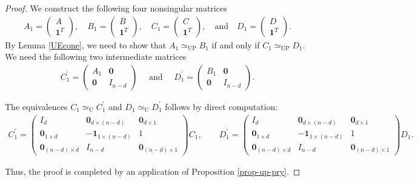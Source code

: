 \documentclass[reqno, 12pt]{article}
\theoremstyle{mydefinition}
\theoremstyle{myremark}
\numberwithin{algorithm}{section}
\begin{document}
\begin{proof}
We construct the following four nonsingular matrices
\begin{align*}
A_1 = \begin{pmatrix} A \\ \mathbf{1}^T \end{pmatrix}, \quad
B_1 = \begin{pmatrix} B \\ \mathbf{1}^T \end{pmatrix}, \quad
C_1 = \begin{pmatrix} C \\ \mathbf{1}^T \end{pmatrix}, \quad \text{and} \quad
D_1 = \begin{pmatrix} D \\ \mathbf{1}^T \end{pmatrix}.
\end{align*}
By Lemma \ref{UEcone}, we need to show that $A_1 \simeq_{\mathrm{UP}} B_1$ if and only if $C_1 \simeq_{\mathrm{UP}} D_1$.
We need the following two intermediate matrices
\begin{align*}
C_1^{\prime} =\begin{pmatrix}
A_1 & \mathbf{0} \\
\mathbf{0} & I_{n-d}
\end{pmatrix}\quad\text{ and } \quad
D_1^{\prime}= \begin{pmatrix}
B_1 & \mathbf{0} \\
\mathbf{0} & I_{n-d}
\end{pmatrix}.
\end{align*}

The equivalences $C_1 \simeq_{\mathrm{U}} C_1^{\prime}$ and $D_1 \simeq_{\mathrm{U}} D_1^{\prime}$ follows by direct computation:
\begin{align*}
C_1^{\prime}
= \begin{pmatrix}
I_d & \mathbf{0}_{d \times (n-d)} & \mathbf{0}_{d \times 1} \\
\mathbf{0}_{1 \times d} & -\mathbf{1}_{1 \times (n-d)} & 1 \\
\mathbf{0}_{(n-d) \times d} & I_{n-d} & \mathbf{0}_{(n-d) \times 1}
\end{pmatrix} C_1, \quad \quad
D_1^{\prime}=  \begin{pmatrix}
I_d & \mathbf{0}_{d \times (n-d)} & \mathbf{0}_{d \times 1} \\
\mathbf{0}_{1 \times d} & -\mathbf{1}_{1 \times (n-d)} & 1 \\
\mathbf{0}_{(n-d) \times d} & I_{n-d} & \mathbf{0}_{(n-d) \times 1}
\end{pmatrix} D_1.
\end{align*}

Thus, the proof is completed by an application of Proposition \ref{prop-up-pry}.
\end{proof}
\end{document}

